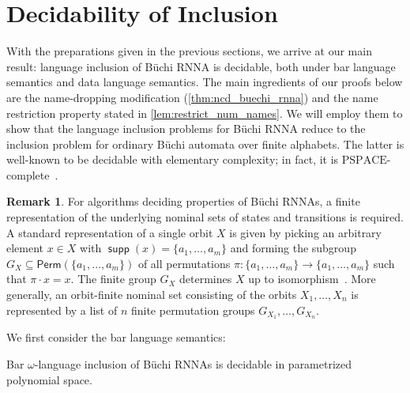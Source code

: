 \documentclass[10pt,a4paper]{amsart}
\renewcommand{\o}{\cdot}
\numberwithin{equation}{section}
\newcommand{\seq}{\subseteq}
\newcommand{\Perm}{\mathsf{Perm}}
\newcommand{\PSPACE}{\mathrm{PSPACE}}
\newcommand{\+}[1]{\mathcal{#1}\xspace}
\DeclareMathOperator{\supp}{\mathsf{supp}} %
\theoremstyle{definition}
\newtheorem{rem}[theorem]{Remark}
\begin{document}
\section{Decidability of Inclusion}\label{sec:decidability}
%
With the preparations given in the previous sections, we
arrive at our main result: language inclusion of Büchi RNNA is
decidable, both under bar language semantics and data language
semantics. The main ingredients of our proofs below are the
name-dropping modification (\autoref{thm:ncd_buechi_rnna}) and the
name restriction property stated in
\autoref{lem:restrict_num_names}. We will employ them to show that the
language inclusion problems for Büchi RNNA reduce to the inclusion
problem for ordinary Büchi automata over finite alphabets. The latter is
well-known to be decidable with elementary complexity; in fact, it is $\PSPACE$-complete~\cite{kv96}.
%
\begin{rem}
  For algorithms deciding properties of Büchi RNNAs, a finite
  representation of the underlying nominal sets of states and
  transitions is required. A standard representation of a single orbit
  $X$ is given by picking an arbitrary element $x\in X$ with
  $\supp(x)=\{a_1,\ldots, a_m\}$ and forming the subgroup
  $G_X\seq \Perm(\{a_1,\ldots,a_m\})$ of all permutations
  $\pi\colon \{a_1,\ldots, a_m\}\to \{a_1,\ldots, a_m\}$ such that
  $\pi\o x = x$. The finite group $G_X$ determines $X$ up to
  isomorphism~\cite[Thm. 5.13]{Pitts13}. More generally, an
  orbit-finite nominal set consisting of the orbits $X_1,\ldots, X_n$
  is represented by a list of $n$ finite permutation groups
  $G_{X_1},\ldots, G_{X_n}$.
\end{rem}
%
We first consider the bar language semantics:
%

\begin{theorem}\label{thm:inclusion_decidable}
  Bar $\omega$-language inclusion of Büchi RNNAs is decidable in parametrized
  polynomial space.
\end{theorem}
\end{document}
